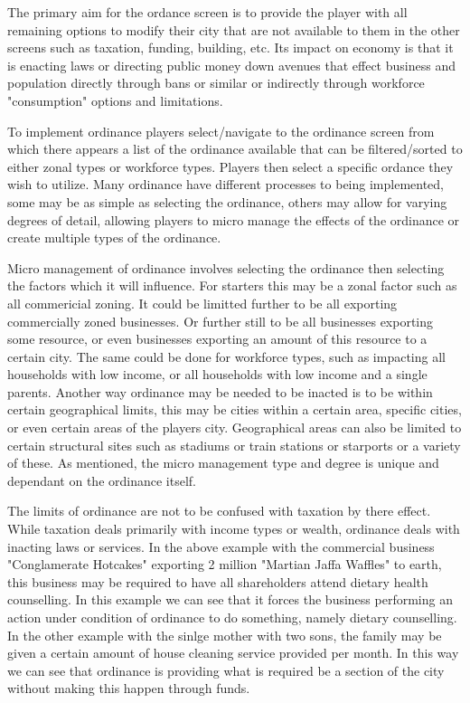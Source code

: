 The primary aim for the ordance screen is to provide the player with all remaining options to modify their city that are not available to them in the other screens such as taxation, funding, building, etc. Its impact on economy is that it is enacting laws or directing public money down avenues that effect business and population directly through bans or similar or indirectly through workforce "consumption" options and limitations.

To implement ordinance players select/navigate to the ordinance screen from which there appears a list of the ordinance available that can be filtered/sorted to either zonal types or workforce types. Players then select a specific ordance they wish to utilize. Many ordinance have different processes to being implemented, some may be as simple as selecting the ordinance, others may allow for varying degrees of detail, allowing players to micro manage the effects of the ordinance or create multiple types of the ordinance. 

Micro management of ordinance involves selecting the ordinance then selecting the factors which it will influence. For starters this may be a zonal factor such as all commericial zoning. It could be limitted further to be all exporting commercially zoned businesses. Or further still to be all businesses exporting some resource, or even businesses exporting an amount of this resource to a certain city. The same could be done for workforce types, such as impacting all households with low income, or all households with low income and a single parents. Another way ordinance may be needed to be inacted is to be within certain geographical limits, this may be cities within a certain area, specific cities, or even certain areas of the players city. Geographical areas can also be limited to certain structural sites such as stadiums or train stations or starports or a variety of these. As mentioned, the micro management type and degree is unique and dependant on the ordinance itself.

The limits of ordinance are not to be confused with taxation by there effect. While taxation deals primarily with income types or wealth, ordinance deals with inacting laws or services. In the above example with the commercial business "Conglamerate Hotcakes" exporting 2 million "Martian Jaffa Waffles" to earth, this business may be required to have all shareholders attend dietary health counselling. In this example we can see that it forces the business performing an action under condition of ordinance to do something, namely dietary counselling. In the other example with the sinlge mother with two sons, the family may be given a certain amount of house cleaning service provided per month. In this way we can see that ordinance is providing what is required be a section of the city without making this happen through funds.  


